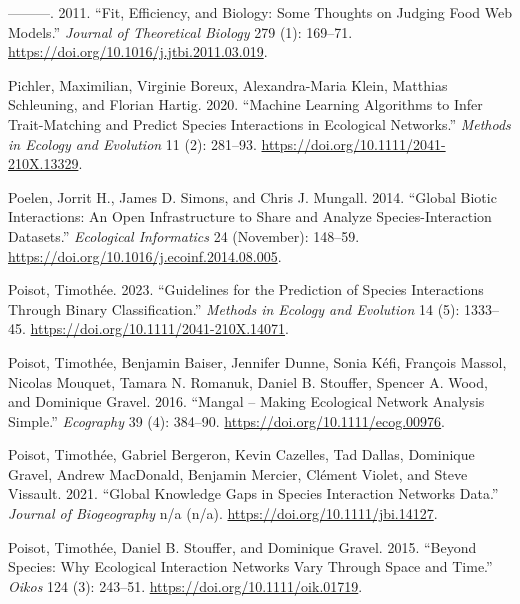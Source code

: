 \documentclass[
  letterpaper,
  DIV=11,
  numbers=noendperiod]{scrartcl}
\newlength{\cslhangindent}
\newenvironment{CSLReferences}[2] %
 {\begin{list}{}{%
  \setlength{\itemindent}{0pt}
  \setlength{\leftmargin}{0pt}
  \setlength{\parsep}{0pt}
  \ifodd #1
   \setlength{\leftmargin}{\cslhangindent}
   \setlength{\itemindent}{-1\cslhangindent}
  \fi
  \setlength{\itemsep}{#2\baselineskip}}}
 {\end{list}}
\begin{document}
\begin{CSLReferences}{1}{0}
---------. 2011. {``Fit, Efficiency, and Biology: {Some} Thoughts on
Judging Food Web Models.''} \emph{Journal of Theoretical Biology} 279
(1): 169--71. \url{https://doi.org/10.1016/j.jtbi.2011.03.019}.

Pichler, Maximilian, Virginie Boreux, Alexandra-Maria Klein, Matthias
Schleuning, and Florian Hartig. 2020. {``Machine Learning Algorithms to
Infer Trait-Matching and Predict Species Interactions in Ecological
Networks.''} \emph{Methods in Ecology and Evolution} 11 (2): 281--93.
\url{https://doi.org/10.1111/2041-210X.13329}.

Poelen, Jorrit H., James D. Simons, and Chris J. Mungall. 2014.
{``Global Biotic Interactions: {An} Open Infrastructure to Share and
Analyze Species-Interaction Datasets.''} \emph{Ecological Informatics}
24 (November): 148--59.
\url{https://doi.org/10.1016/j.ecoinf.2014.08.005}.

Poisot, Timothée. 2023. {``Guidelines for the Prediction of Species
Interactions Through Binary Classification.''} \emph{Methods in Ecology
and Evolution} 14 (5): 1333--45.
\url{https://doi.org/10.1111/2041-210X.14071}.

Poisot, Timothée, Benjamin Baiser, Jennifer Dunne, Sonia Kéfi, François
Massol, Nicolas Mouquet, Tamara N. Romanuk, Daniel B. Stouffer, Spencer
A. Wood, and Dominique Gravel. 2016. {``Mangal -- Making Ecological
Network Analysis Simple.''} \emph{Ecography} 39 (4): 384--90.
\url{https://doi.org/10.1111/ecog.00976}.

Poisot, Timothée, Gabriel Bergeron, Kevin Cazelles, Tad Dallas,
Dominique Gravel, Andrew MacDonald, Benjamin Mercier, Clément Violet,
and Steve Vissault. 2021. {``Global Knowledge Gaps in Species
Interaction Networks Data.''} \emph{Journal of Biogeography} n/a (n/a).
\url{https://doi.org/10.1111/jbi.14127}.

Poisot, Timothée, Daniel B. Stouffer, and Dominique Gravel. 2015.
{``Beyond Species: Why Ecological Interaction Networks Vary Through
Space and Time.''} \emph{Oikos} 124 (3): 243--51.
\url{https://doi.org/10.1111/oik.01719}.


\end{CSLReferences}
\end{document}
